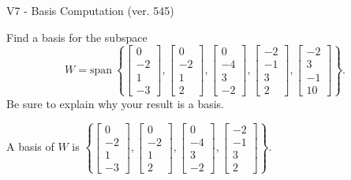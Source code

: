 \begin{exercise}
  \begin{exerciseTitle}V7 - Basis Computation (ver. 545)\end{exerciseTitle}
  \begin{exerciseStatement}
    Find a basis for the subspace 
\[W=\mathrm{span}\ \left\{\left[\begin{array}{r}
0 \\
-2 \\
1 \\
-3
\end{array}\right] , \left[\begin{array}{r}
0 \\
-2 \\
1 \\
2
\end{array}\right] , \left[\begin{array}{r}
0 \\
-4 \\
3 \\
-2
\end{array}\right] , \left[\begin{array}{r}
-2 \\
-1 \\
3 \\
2
\end{array}\right] , \left[\begin{array}{r}
-2 \\
3 \\
-1 \\
10
\end{array}\right]\right\}.\]
 Be sure to explain why your result is a basis.


  \end{exerciseStatement}
  \begin{exerciseAnswer}
   A basis of \(W\) is  \(\left\{\left[\begin{array}{r}
0 \\
-2 \\
1 \\
-3
\end{array}\right] , \left[\begin{array}{r}
0 \\
-2 \\
1 \\
2
\end{array}\right] , \left[\begin{array}{r}
0 \\
-4 \\
3 \\
-2
\end{array}\right] , \left[\begin{array}{r}
-2 \\
-1 \\
3 \\
2
\end{array}\right]\right\}\).
  


  \end{exerciseAnswer}
\end{exercise}